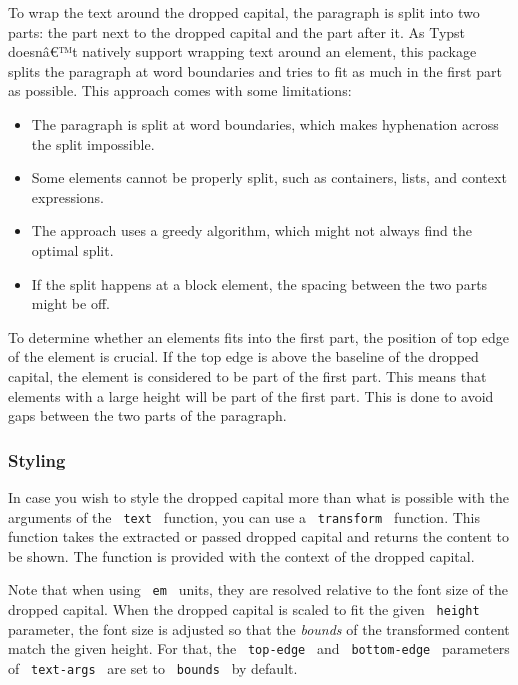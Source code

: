 To wrap the text around the dropped capital, the paragraph is split into
two parts: the part next to the dropped capital and the part after it.
As Typst doesnâ€™t natively support wrapping text around an element,
this package splits the paragraph at word boundaries and tries to fit as
much in the first part as possible. This approach comes with some
limitations:

\begin{itemize}
\tightlist
\item
  The paragraph is split at word boundaries, which makes hyphenation
  across the split impossible.
\item
  Some elements cannot be properly split, such as containers, lists, and
  context expressions.
\item
  The approach uses a greedy algorithm, which might not always find the
  optimal split.
\item
  If the split happens at a block element, the spacing between the two
  parts might be off.
\end{itemize}

To determine whether an elements fits into the first part, the position
of top edge of the element is crucial. If the top edge is above the
baseline of the dropped capital, the element is considered to be part of
the first part. This means that elements with a large height will be
part of the first part. This is done to avoid gaps between the two parts
of the paragraph.

\subsubsection{Styling}\label{styling}

In case you wish to style the dropped capital more than what is possible
with the arguments of the \texttt{\ text\ } function, you can use a
\texttt{\ transform\ } function. This function takes the extracted or
passed dropped capital and returns the content to be shown. The function
is provided with the context of the dropped capital.

Note that when using \texttt{\ em\ } units, they are resolved relative
to the font size of the dropped capital. When the dropped capital is
scaled to fit the given \texttt{\ height\ } parameter, the font size is
adjusted so that the \emph{bounds} of the transformed content match the
given height. For that, the \texttt{\ top-edge\ } and
\texttt{\ bottom-edge\ } parameters of \texttt{\ text-args\ } are set to
\texttt{\ bounds\ } by default.

